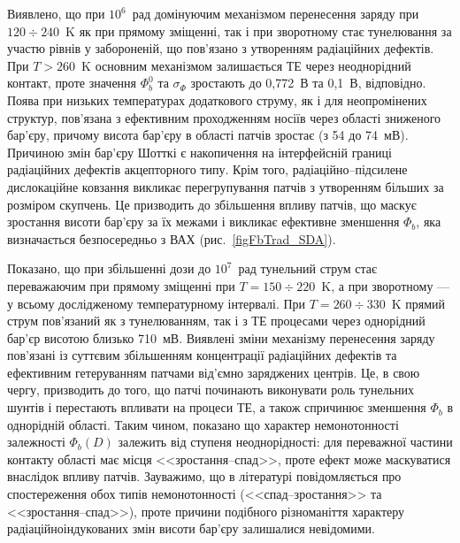 Виявлено, що при $10^6$~рад домінуючим механізмом перенесення заряду при $120\div240$~K як при прямому зміщенні, так і при зворотному стає тунелювання за участю рівнів у забороненій, що пов'язано з утворенням радіаційних дефектів.
При $T>260$~K основним механізмом залишається ТЕ через неоднорідний контакт, проте значення $\Phi_b^0$ та $\sigma_{\Phi}$
зростають до 0,772~В та 0,1~В, відповідно.
Поява при низьких температурах додаткового струму, як і для неопромінених структур, пов'язана з ефективним проходженням носіїв через області зниженого бар'єру, причому висота бар'єру в області патчів зростає (з 54 до 74~мВ).
Причиною змін бар'єру Шотткі є накопичення на інтерфейсній границі радіаційних дефектів акцепторного типу.
Крім того, радіаційно--підсилене дислокаційне ковзання викликає  перегрупування патчів з утворенням більших за розміром скупчень.
Це призводить до збільшення впливу патчів, що  маскує зростання висоти бар'єру за їх межами і викликає ефективне зменшення $\Phi_b$, яка визначається безпосередньо з ВАХ (рис.~\ref{figFbTrad_SDA}).

Показано, що
при збільшенні дози до $10^7$~рад тунельний струм стає переважаючим
при прямому зміщенні при $T=150\div220$~K,
а при зворотному --- у всьому дослідженому температурному інтервалі.
При $T=260\div330$~K прямий струм пов'язаний як з тунелюванням, так і з ТЕ процесами через однорідний бар'єр висотою близько 710~мВ.
Виявлені зміни механізму перенесення заряду пов'язані із суттєвим збільшенням концентрації радіаційних дефектів та ефективним гетеруванням патчами від'ємно заряджених центрів.
Це, в свою чергу, призводить до того, що патчі починають виконувати роль тунельних шунтів і перестають впливати на процеси ТЕ, а також спричинює зменшення $\Phi_b$ в однорідній області.
Таким чином, показано що
характер немонотонності залежності $\Phi_b(D)$ залежить від ступеня неоднорідності:
для переважної частини контакту області має місця <<зростання--спад>>, проте ефект може маскуватися внаслідок впливу патчів.
Зауважимо, що в літературі повідомляється про спостереження обох типів немонотонності (<<спад--зростання>> та <<зростання--спад>>),
проте причини подібного різноманіття характеру радіаційноіндукованих змін висоти бар'єру залишалися невідомими. 


